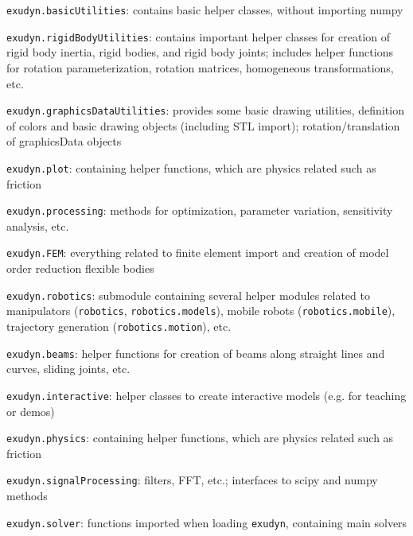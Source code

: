     \item[--] \texttt{exudyn.basicUtilities}: contains basic helper classes, without importing numpy
    \item[--] \texttt{exudyn.rigidBodyUtilities}: contains important helper classes for creation of rigid body inertia, rigid bodies, and rigid body joints; includes helper functions for rotation parameterization, rotation matrices, homogeneous transformations, etc.
    \item[--] \texttt{exudyn.graphicsDataUtilities}: provides some basic drawing utilities, definition of colors and basic drawing objects (including \acs{STL} import); rotation/translation of graphicsData objects
    \item[--] \texttt{exudyn.plot}: containing helper functions, which are physics related such as friction
    \item[--] \texttt{exudyn.processing}: methods for optimization, parameter variation, sensitivity analysis, etc.
    \item[--] \texttt{exudyn.FEM}: everything related to finite element import and creation of model order reduction flexible bodies
    \item[--] \texttt{exudyn.robotics}: submodule containing several helper modules related to manipulators (\texttt{robotics}, \texttt{robotics.models}), mobile robots (\texttt{robotics.mobile}), trajectory generation (\texttt{robotics.motion}), etc.
    \item[--] \texttt{exudyn.beams}: helper functions for creation of beams along straight lines and curves, sliding joints, etc.
    \item[--] \texttt{exudyn.interactive}: helper classes to create interactive models (e.g. for teaching or demos)
    \item[--] \texttt{exudyn.physics}: containing helper functions, which are physics related such as friction
    \item[--] \texttt{exudyn.signalProcessing}: filters, FFT, etc.; interfaces to scipy and numpy methods
    \item[--] \texttt{exudyn.solver}: functions imported when loading \texttt{exudyn}, containing main solvers
  \ei
\ei
%

